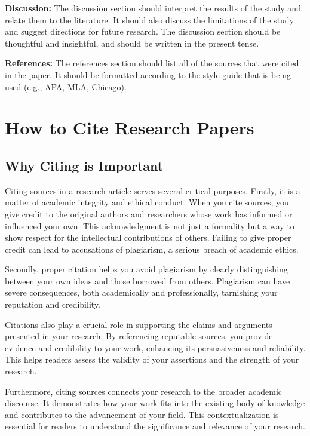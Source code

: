 \documentclass[
  b5paper]{book}
\begin{document}
\textbf{Discussion:} The discussion section should interpret the results of the study and relate them to the literature. It should also discuss the limitations of the study and suggest directions for future research. The discussion section should be thoughtful and insightful, and should be written in the present tense.

\textbf{References:} The references section should list all of the sources that were cited in the paper. It should be formatted according to the style guide that is being used (e.g., APA, MLA, Chicago).

\hypertarget{cite}{%
\section{How to Cite Research Papers}\label{cite}}

\hypertarget{why-citing-is-important}{%
\subsection{Why Citing is Important}\label{why-citing-is-important}}

Citing sources in a research article serves several critical purposes. Firstly, it is a matter of academic integrity and ethical conduct. When you cite sources, you give credit to the original authors and researchers whose work has informed or influenced your own. This acknowledgment is not just a formality but a way to show respect for the intellectual contributions of others. Failing to give proper credit can lead to accusations of plagiarism, a serious breach of academic ethics.

Secondly, proper citation helps you avoid plagiarism by clearly distinguishing between your own ideas and those borrowed from others. Plagiarism can have severe consequences, both academically and professionally, tarnishing your reputation and credibility.

Citations also play a crucial role in supporting the claims and arguments presented in your research. By referencing reputable sources, you provide evidence and credibility to your work, enhancing its persuasiveness and reliability. This helps readers assess the validity of your assertions and the strength of your research.

Furthermore, citing sources connects your research to the broader academic discourse. It demonstrates how your work fits into the existing body of knowledge and contributes to the advancement of your field. This contextualization is essential for readers to understand the significance and relevance of your research.
\end{document}
